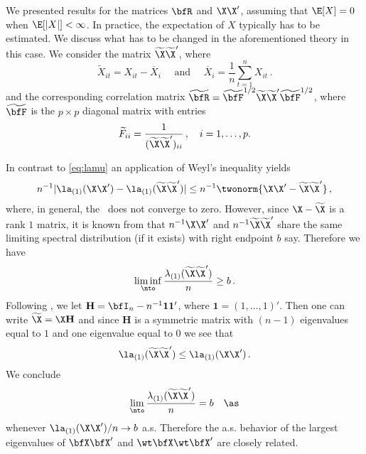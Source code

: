 We presented results for the matrices $\bfR$ and $\X\X'$, assuming that $\E[X]=0$ when $\E[|X|]<\infty$. 
In practice, the expectation of $X$ typically has to be estimated. We discuss what has to be changed in the
aforementioned theory in this case. We consider the matrix $\widetilde{\X}\widetilde{\X}'$, where 
\begin{equation*}
\widetilde{X}_{it}= X_{it}- \overline{X}_i \quad \text{ and } \quad \overline{X}_i= \frac{1}{n} \sum_{t=1}^n X_{it}\,.
\end{equation*}
and the corresponding correlation matrix $\widetilde{\bfR} = \widetilde{\bfF}^{1/2} \widetilde{\X}\widetilde{\X}'\widetilde{\bfF}^{1/2}$, where $\widetilde{\bfF}$ is the $p\times p$ diagonal matrix with entries 
\begin{equation*}
\widetilde{F}_{ii}= \frac{1}{(\widetilde{\X}\widetilde{\X}')_{ii}}\,, \quad i=1,\ldots,p.
\end{equation*}
\par
In contrast to \eqref{eq:lamu} an application of Weyl's inequality \cite{bai:silverstein:2010} yields
\begin{equation}\label{eq:sgsgrs}
n^{-1} |\la_{(1)}(\X\X')- \la_{(1)}(\widetilde{\X}\widetilde{\X}')| \le n^{-1} \twonorm{\X\X'-\widetilde{\X}\widetilde{\X}'}\,,
\end{equation}
where, in general, the \rhs\ does not converge to zero. 
However, since $\X-\widetilde{\X}$ is a rank $1$ matrix, it is known from \cite{bai:silverstein:2010} that $n^{-1} \X\X'$ and $n^{-1}  \widetilde{\X}\widetilde{\X}'$ share the same limiting spectral distribution (if it exists) with right endpoint $b$ say. Therefore we have
\begin{equation*}
\liminf_{\nto} \frac{\lambda_{(1)}(\widetilde{\X}\widetilde{\X}')}{n} \ge b\,.
\end{equation*}
Following \cite{elkaroui:2009}, we let $\mathbf{H}= \bfI_n-n^{-1} \mathbf{1}\mathbf{1}'$, where $\mathbf{1}=(1,\ldots,1)'$. Then one can write $\widetilde{\X}=\X \mathbf{H}$ and since $\mathbf{H}$ is a symmetric matrix with $(n-1)$ eigenvalues equal to $1$ and one eigenvalue equal to $0$ we see that
\begin{equation*}
\la_{(1)}(\widetilde{\X}\widetilde{\X}') \le \la_{(1)}(\X\X')\,.
\end{equation*} 
We conclude
\begin{equation*}
\lim_{\nto} \frac{\lambda_{(1)}(\widetilde{\X}\widetilde{\X}')}{n} = b\quad \as
\end{equation*}
whenever $\la_{(1)}(\X\X')/n \to b$ a.s. Therefore the a.s. behavior of the largest eigenvalues of $\bfX\bfX'$ and $\wt \bfX\wt\bfX'$ are
closely related. %


